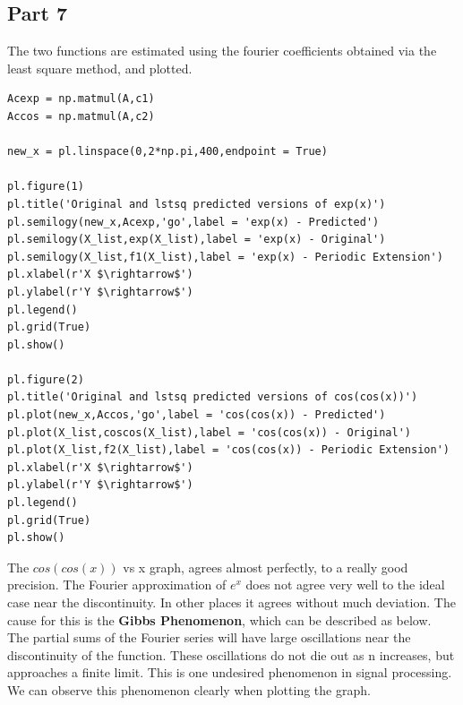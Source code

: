 \documentclass[11pt, a4paper]{article}
\begin{document}
\subsection{Part 7}
The two functions are estimated using the fourier coefficients obtained via the least square method, and plotted.
\begin{verbatim}
Acexp = np.matmul(A,c1)
Accos = np.matmul(A,c2)

new_x = pl.linspace(0,2*np.pi,400,endpoint = True)

pl.figure(1)
pl.title('Original and lstsq predicted versions of exp(x)')
pl.semilogy(new_x,Acexp,'go',label = 'exp(x) - Predicted')
pl.semilogy(X_list,exp(X_list),label = 'exp(x) - Original')
pl.semilogy(X_list,f1(X_list),label = 'exp(x) - Periodic Extension')
pl.xlabel(r'X $\rightarrow$')
pl.ylabel(r'Y $\rightarrow$')
pl.legend()
pl.grid(True)
pl.show()

pl.figure(2)
pl.title('Original and lstsq predicted versions of cos(cos(x))')
pl.plot(new_x,Accos,'go',label = 'cos(cos(x)) - Predicted')
pl.plot(X_list,coscos(X_list),label = 'cos(cos(x)) - Original')
pl.plot(X_list,f2(X_list),label = 'cos(cos(x)) - Periodic Extension')
pl.xlabel(r'X $\rightarrow$')
pl.ylabel(r'Y $\rightarrow$')
pl.legend()
pl.grid(True)
pl.show()
\end{verbatim}

{The $cos(cos(x))$ vs x graph, agrees almost perfectly, to a really good precision.
The Fourier approximation of $e^{x}$ does not agree very well to the ideal case near the discontinuity. In other places it agrees without much deviation. The cause for this is the \textbf{Gibbs Phenomenon}, which can be described as below.
\\
The partial sums of the Fourier series will have large oscillations near the discontinuity of the function. These oscillations do not die out as n increases, but approaches a finite limit.
This is one undesired phenomenon in signal processing.
\\
We can observe this phenomenon clearly when plotting the graph.
}
\end{document}
